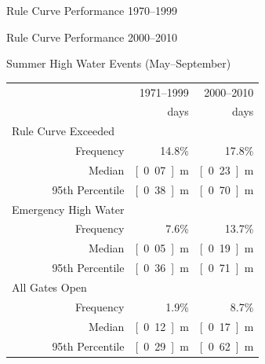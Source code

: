 \documentclass[compress,english]{beamer}
\begin{document}
{{{{\begin{frame}{Rule Curve Performance 1970--1999}
\begin{center}
\end{center}

\end{frame}

\begin{frame}{Rule Curve Performance 2000--2010}

\begin{center}
\end{center}

\end{frame}

\begin{frame}{Summer High Water Events (May--September)}
\vfill
\hfill\begin{tabular}{lrrr}\toprule
\qquad\qquad\qquad\quad & & 1971--1999 & 2000--2010	\\
& & \unit[4437]{days} & \unit[1683]{days} \\
\midrule
\multicolumn{2}{l}{Rule Curve Exceeded} & & \\
& Frequency & 14.8\% & 17.8\% \\
& Median & \unit[0.07]{m} & \unit[0.23]{m}\\
& 95th Percentile & \unit[0.38]{m} & \unit[0.70]{m}\\
\midrule
\multicolumn{2}{l}{Emergency High Water} & & \\
& Frequency & 7.6\% & 13.7\%\\
& Median & \unit[0.05]{m} & \unit[0.19]{m} \\
& 95th Percentile & \unit[0.36]{m} & \unit[0.71]{m} \\
\midrule
\multicolumn{2}{l}{All Gates Open} & &\\
& Frequency & 1.9\% & 8.7\% \\
& Median & \unit[0.12]{m} & \unit[0.17]{m}\\
& 95th Percentile & \unit[0.29]{m} & \unit[0.62]{m} \\
\midrule
\end{tabular}\hfill


\end{frame}}}}}
\end{document}
